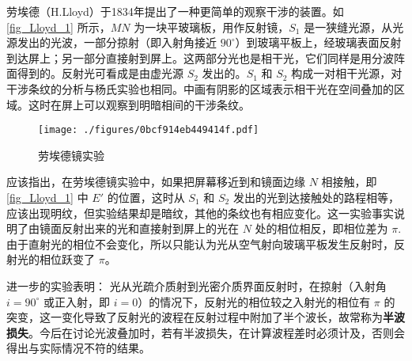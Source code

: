 

劳埃德（H.Lloyd）于1834年提出了一种更简单的观察干涉的装置。如\autoref{fig_Lloyd_1} 所示，$MN $ 为一块平玻璃板，用作反射镜，$S_1$ 是一狭缝光源，从光源发出的光波，一部分掠射（即入射角接近 $90^\circ$）到玻璃平板上，经玻璃表面反射到达屏上；另一部分直接射到屏上。这两部分光也是相干光，它们同样是用分波阵面得到的。反射光可看成是由虚光源 $S_2 $ 发出的。$S_1$ 和 $S_2 $ 构成一对相干光源，对干涉条纹的分析与杨氏实验也相同。中画有阴影的区域表示相干光在空间叠加的区域。这时在屏上可以观察到明暗相间的干涉条纹。
\begin{figure}[ht]
\centering
\texttt{[image: ./figures/0bcf914eb449414f.pdf]}
\caption{劳埃德镜实验} \label{fig_Lloyd_1}
\end{figure}
应该指出，在劳埃德镜实验中，如果把屏幕移近到和镜面边缘 $N $ 相接触，即\autoref{fig_Lloyd_1} 中 $E' $ 的位置，这时从 $S_1$ 和 $S_2$ 发出的光到达接触处的路程相等，应该出现明纹，但实验结果却是暗纹，其他的条纹也有相应变化。这一实验事实说明了由镜面反射出来的光和直接射到屏上的光在 $N $ 处的相位相反，即相位差为 $\pi$. 由于直射光的相位不会变化，所以只能认为光从空气射向玻璃平板发生反射时，反射光的相位跃变了 $\pi$。

进一步的实验表明： 光从光疏介质射到光密介质界面反射时，在掠射（入射角 $i=90^\circ$ 或正入射，即 $i = 0$）的情况下，反射光的相位较之入射光的相位有 $\pi$ 的突变，这一变化导致了反射光的波程在反射过程中附加了半个波长，故常称为\textbf{半波损失}。今后在讨论光波叠加时，若有半波损失，在计算波程差时必须计及，否则会得出与实际情况不符的结果。
